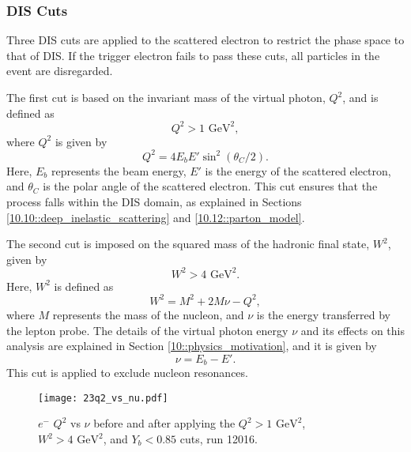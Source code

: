 \subsubsection{DIS Cuts}
\label{13.23::dis_cuts}
    Three DIS cuts are applied to the scattered electron to restrict the phase space to that of DIS.
    If the trigger electron fails to pass these cuts, all particles in the event are disregarded.

    The first cut is based on the invariant mass of the virtual photon, $Q^2$, and is defined as
    \begin{equation*}
        Q^2 > 1 \text{ GeV}^2,
    \end{equation*}
    where $Q^2$ is given by
    \begin{equation}
        Q^2 = 4E_bE'\sin^2(\theta_C/2).
        \label{eq::13.23::q2}
    \end{equation}
    Here, $E_b$ represents the beam energy, $E'$ is the energy of the scattered electron, and $\theta_C$ is the polar angle of the scattered electron.
    This cut ensures that the process falls within the DIS domain, as explained in Sections \ref{10.10::deep_inelastic_scattering} and \ref{10.12::parton_model}.

    The second cut is imposed on the squared mass of the hadronic final state, $W^2$, given by
    \begin{equation*}
        W^2 > 4 \text{ GeV}^2.
    \end{equation*}
    Here, $W^2$ is defined as
    \begin{equation*}
    W^2 = M^2 + 2M\nu - Q^2,
    \end{equation*}
    where $M$ represents the mass of the nucleon, and $\nu$ is the energy transferred by the lepton probe.
    The details of the virtual photon energy $\nu$ and its effects on this analysis are explained in Section \ref{10::physics_motivation}, and it is given by
    \begin{equation}
        \nu = E_b - E'.
        \label{eq::13.23::nu}
    \end{equation}
    This cut is applied to exclude nucleon resonances.

    \begin{figure}[b!]
        \texttt{[image: 23q2\_vs\_nu.pdf]}
        \caption[$Q^2$ vs $\nu$ comparison]
        {$e^-$ $Q^2$ vs $\nu$ before and after applying the $Q^2 > 1 \text{ GeV}^2$, $W^2 > 4 \text{ GeV}^2$, and $Y_b < 0.85$ cuts, run 12016.}
        \label{fig::13.23::q2_vs_nu}
    \end{figure}

